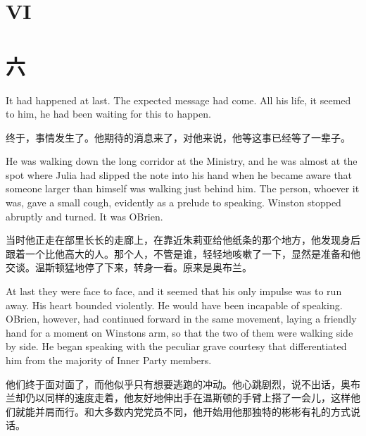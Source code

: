 \begin{paracol}{2}
\switchcolumn*


\section{VI}\label{vi-1}

\switchcolumn

\section*{六}\label{ux5341ux56db}

\switchcolumn*

It had happened at last. The expected message had come. All his life, it
seemed to him, he had been waiting for this to happen.

\switchcolumn

终于，事情发生了。他期待的消息来了，对他来说，他等这事已经等了一辈子。

\switchcolumn*

He was walking down the long corridor at the Ministry, and he was almost
at the spot where Julia had slipped the note into his hand when he
became aware that someone larger than himself was walking just behind
him. The person, whoever it was, gave a small cough, evidently as a
prelude to speaking. Winston stopped abruptly and turned. It was
O\textquotesingle Brien.

\switchcolumn

当时他正走在部里长长的走廊上，在靠近朱莉亚给他纸条的那个地方，他发现身后跟着一个比他高大的人。那个人，不管是谁，轻轻地咳嗽了一下，显然是准备和他交谈。温斯顿猛地停了下来，转身一看。原来是奥布兰。

\switchcolumn*

At last they were face to face, and it seemed that his only impulse was
to run away. His heart bounded violently. He would have been incapable
of speaking. O\textquotesingle Brien, however, had continued forward in
the same movement, laying a friendly hand for a moment on
Winston\textquotesingle s arm, so that the two of them were walking side
by side. He began speaking with the peculiar grave courtesy that
differentiated him from the majority of Inner Party members.

\switchcolumn

他们终于面对面了，而他似乎只有想要逃跑的冲动。他心跳剧烈，说不出话，奥布兰却仍以同样的速度走着，他友好地伸出手在温斯顿的手臂上搭了一会儿，这样他们就能并肩而行。和大多数内党党员不同，他开始用他那独特的彬彬有礼的方式说话。


\end{paracol}
